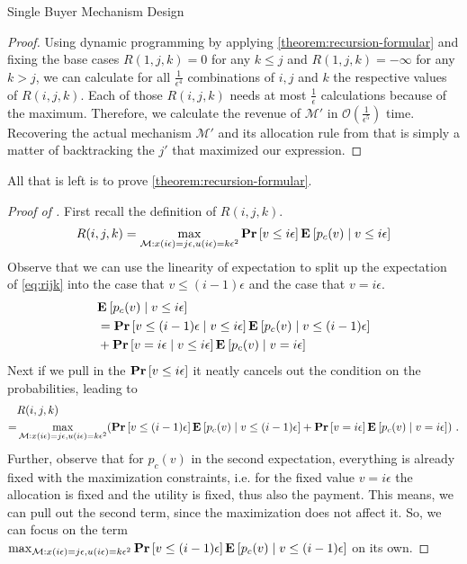 \documentclass[11pt,a4paper]{article}
\renewcommand{\Pr}[1]{\mbox{\rm\bf Pr}\left[#1\right]}
\newcommand{\Ex}[2][]{\mbox{\rm\bf E}_{#1}\left[#2\right]}
\newcommand{\1}[1]{\mbox{\rm\bf 1}_{#1}}
\newcommand{\eqdot}{\text{ .}}
\begin{document}
\begin{section}{Single Buyer Mechanism Design}
\begin{proof}
     Using dynamic programming by applying \cref{theorem:recursion-formular} and fixing the base cases $R(1,j,k) = 0$ for any $k \leq j$ and $R(1,j,k)=-\infty$ for any $k > j$,
     we can calculate for all $\frac{1}{\epsilon^4}$ combinations of $i,j$ and $k$ the respective values of $R(i,j,k)$.
     Each of those $R(i,j,k)$ needs at most $\frac{1}{\epsilon}$ calculations because of the maximum.
     Therefore, we calculate the revenue of $\mathcal{M}'$ in $\mathcal{O}\left(\frac{1}{\epsilon^5}\right)$ time.
     Recovering the actual mechanism $\mathcal{M}'$ and its allocation rule from that is simply a matter of backtracking the $j'$ that maximized our expression.
 \end{proof}

 All that is left is to prove \cref{theorem:recursion-formular}.
 \begin{proof}[Proof of ]
     First recall the definition of $R(i,j,k)$.
     \begin{align*}
         R(i,j,k) = \max_{\mathcal{M}: x(i\epsilon) = j\epsilon, u(i\epsilon) = k \epsilon^2} \Pr{v \leq i\epsilon}\Ex{p_c(v)\mid v \leq i \epsilon}
     \end{align*}
     Observe that we can use the linearity of expectation to split up the expectation of \cref{eq:rijk} into the case that $v \leq (i-1)\epsilon$ and the case that $v = i \epsilon$.
     \begin{align*}
          & \Ex{p_c(v)\mid v \leq i \epsilon}                                                           \\
          & = \Pr{v \leq (i-1)\epsilon \mid v \leq i \epsilon} \Ex{p_c(v) \mid v \leq (i - 1) \epsilon} \\
          & + \Pr{v = i \epsilon \mid v \leq i \epsilon} \Ex{p_c(v) \mid v = i \epsilon}
     \end{align*}
     Next if we pull in the $\Pr{v \leq i\epsilon}$ it neatly cancels out the condition on the probabilities, leading to
     \begin{align*}
           & R(i,j,k)                                                                                                                                                                                                    \\
         = & \max_{\mathcal{M}: x(i\epsilon) = j\epsilon, u(i\epsilon) = k \epsilon^2} (\Pr{v \leq (i-1)\epsilon} \Ex{p_c(v) \mid v \leq (i - 1) \epsilon} + \Pr{v = i \epsilon} \Ex{p_c(v) \mid v = i \epsilon}) \eqdot
     \end{align*}
     Further, observe that for $p_c(v)$ in the second expectation, everything is already fixed with the maximization constraints, i.e. for the fixed value $v = i \epsilon$ the allocation is fixed and the utility is fixed, thus also the payment.
     This means, we can pull out the second term, since the maximization does not affect it.
     So, we can focus on the term $\max_{\mathcal{M}: x(i\epsilon) = j\epsilon, u(i\epsilon)=k\epsilon^2} \Pr{v \leq (i-1)\epsilon} \Ex{p_c(v) \mid v \leq (i - 1) \epsilon}$ on its own.


\end{proof}
\end{section}
\end{document}

